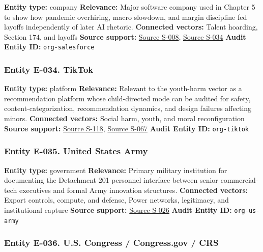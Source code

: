 \documentclass[
  american,
  11pt,
  letterpaper,
]{article}
\begin{document}
\textbf{Entity type:} company \textbf{Relevance:} Major software company
used in Chapter 5 to show how pandemic overhiring, macro slowdown, and
margin discipline fed layoffs independently of later AI rhetoric.
\textbf{Connected vectors:} Talent hoarding, Section 174, and layoffs
\textbf{Source support:}
\hyperref[source-s-008-amazon-salesforce-jettison-jobs-in-latest-tech-worker-purge]{Source
S-008},
\hyperref[source-s-034-big-tech-layoffs-shattered-industry-worker-confidence]{Source
S-034} \textbf{Audit Entity ID:} \texttt{org-salesforce}

\subsubsection{Entity E-034. TikTok}\label{entity-e-034-tiktok}

\textbf{Entity type:} platform \textbf{Relevance:} Relevant to the
youth-harm vector as a recommendation platform whose child-directed mode
can be audited for safety, content-categorization, recommendation
dynamics, and design failures affecting minors. \textbf{Connected
vectors:} Social harm, youth, and moral reconfiguration \textbf{Source
support:}
\hyperref[source-s-118-when-kids-mode-isn-t-for-kids-investigating-tiktok-s-under-13-experience]{Source
S-118},
\hyperref[source-s-067-social-media-algorithms-amplifying-misogynistic-content]{Source
S-067} \textbf{Audit Entity ID:} \texttt{org-tiktok}

\subsubsection{Entity E-035. United States
Army}\label{entity-e-035-united-states-army}

\textbf{Entity type:} government \textbf{Relevance:} Primary military
institution for documenting the Detachment 201 personnel interface
between senior commercial-tech executives and formal Army innovation
structures. \textbf{Connected vectors:} Export controls, compute, and
defense, Power networks, legitimacy, and institutional capture
\textbf{Source support:}
\hyperref[source-s-026-army-launches-detachment-201-executive-innovation-corps-to-drive-tech-transformation]{Source
S-026} \textbf{Audit Entity ID:} \texttt{org-us-army}

\subsubsection{Entity E-036. U.S. Congress / Congress.gov /
CRS}\label{entity-e-036-u-s-congress-congress-gov-crs}
\end{document}
